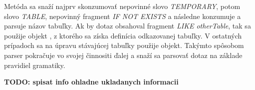 Metóda  sa snaží najprv skonzumovať nepovinné slovo \textit{TEMPORARY}, potom slovo \textit{TABLE}, nepovinný fragment \textit{IF NOT EXISTS} a následne konzumuje a parsuje názov tabuľky. Ak by dotaz obsahoval fragment \textit{LIKE otherTable}, tak sa použije objekt , z ktorého sa získa definícia odkazovanej tabuľky. V ostatných prípadoch sa na úpravu stávajúcej tabuľky použije  objekt. Takýmto spôsobom parser pokračuje vo svojej činnositi ďalej a snaží sa parsovať dotaz na základe pravidiel gramatiky.

\textbf{TODO: spisat info ohladne ukladanych informacii}